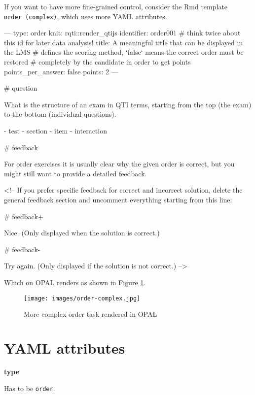 \documentclass[twoside]{tufte-book}
\newenvironment{Shaded}{}{}
\begin{document}
If you want to have more fine-grained control, consider the Rmd template \texttt{order\ (complex)}, which uses more YAML attributes.

\begin{Shaded}
\begin{Highlighting}
---
type: order
knit: rqti::render_qtijs
identifier: order001 # think twice about this id for later data analysis!
title: A meaningful title that can be displayed in the LMS
# defines the scoring method, `false` means the correct order must be restored
# completely by the candidate in order to get points
points_per_answer: false
points: 2
---

# question

What is the structure of an exam in QTI terms, starting from the top (the exam)
to the bottom (individual questions).

- test
- section
- item
- interaction

# feedback

For order exercises it is usually clear why the given order is correct, but you
might still want to provide a detailed feedback.

<!-- If you prefer specific feedback for correct and incorrect solution, delete
the general feedback section and uncomment everything starting from this line:

# feedback+

Nice. (Only displayed when the solution is correct.)

# feedback-

Try again. (Only displayed if the solution is not correct.)
-->
\end{Highlighting}
\end{Shaded}

Which on OPAL renders as shown in Figure \ref{order2opal}.

\begin{figure}
\centering
\texttt{[image: images/order-complex.jpg]}
\caption{\label{order2opal}More complex order task rendered in OPAL}
\end{figure}

\section{YAML attributes}\label{YAML-attributes-5}

\noindent\textbf{type}\label{type-5}

Has to be \texttt{order}.
\end{document}
